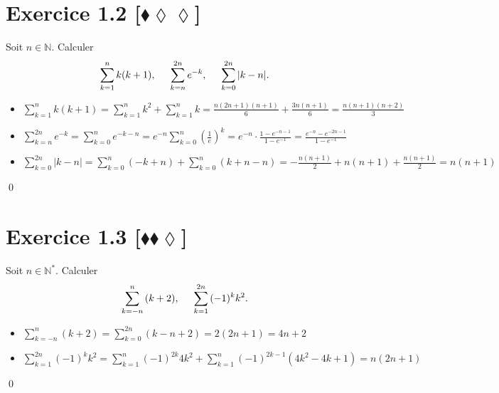 \documentclass[10pt]{article}
\begin{document}
\section*{Exercice 1.2 [$\blacklozenge\lozenge\lozenge$]}

\begin{tcolorbox}[enhanced, width=7in, center, size=fbox, fontupper=\large, drop shadow southwest]
    Soit $n\in\mathbb{N}$. Calculer
    \begin{equation*}
        \sum\limits^{n}_{k=1}{k(k+1)}, \hspace{0.5cm} \sum\limits^{2n}_{k=n}{e^{-k}}, \hspace{0.5cm} \sum\limits^{2n}_{k=0}{|k-n|}.
    \end{equation*}
    \begin{itemize}
        \item $\sum\limits^n_{k=1}{k(k+1)} = \sum\limits^n_{k=1}{k^2} + \sum\limits^n_{k=1}{k} = \frac{n(2n+1)(n+1)}{6}+\frac{3n(n+1)}{6}=\frac{n(n+1)(n + 2)}{3}$
        \item $\sum\limits^{2n}_{k=n}{e^{-k}} = \sum\limits^{n}_{k=0}{e^{-k-n}}=e^{-n}\sum\limits^{n}_{k=0}{(\frac{1}{e})^k}=e^{-n}\cdot\frac{1-e^{-n-1}}{1-e^{-1}}=\frac{e^{-n}-e^{-2n-1}}{1-e^{-1}}$
        \item $\sum\limits^{2n}_{k=0}{|k-n|}=\sum\limits^{n}_{k=0}{(-k+n)}+\sum\limits^{n}_{k=0}{(k+n-n)}=-\frac{n(n+1)}{2}+n(n+1)+\frac{n(n+1)}{2}=n(n+1)$
    \end{itemize}
    \qed
\end{tcolorbox}


\section*{Exercice 1.3 [$\blacklozenge\blacklozenge\lozenge$]}

\begin{tcolorbox}[enhanced, width=7in, center, size=fbox, fontupper=\large, drop shadow southwest]
    Soit $n\in\mathbb{N}^*$. Calculer
    \begin{equation*}
        \sum\limits^{n}_{k=-n}{(k+2)}, \hspace{0.5cm} \sum\limits^{2n}_{k=1}{(-1)^kk^2}.
    \end{equation*}
    \begin{itemize}
        \item $\sum\limits^{n}_{k=-n}{(k+2)}=\sum\limits^{2n}_{k=0}{(k-n+2)}=2(2n+1)=4n+2$
        \item $\sum\limits^{2n}_{k=1}{(-1)^kk^2}=\sum\limits^{n}_{k=1}{(-1)^{2k}4k^2}+\sum\limits^{n}_{k=1}{(-1)^{2k-1}(4k^2-4k+1)}=n(2n+1)$
    \end{itemize}
    \qed
\end{tcolorbox}
\end{document}
